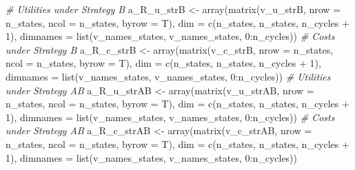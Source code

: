 \documentclass[
]{article}
\newenvironment{Shaded}{\begin{snugshade}}{\end{snugshade}}
\newcommand{\AttributeTok}[1]{\textcolor[rgb]{0.77,0.63,0.00}{#1}}
\newcommand{\CommentTok}[1]{\textcolor[rgb]{0.56,0.35,0.01}{\textit{#1}}}
\newcommand{\DecValTok}[1]{\textcolor[rgb]{0.00,0.00,0.81}{#1}}
\newcommand{\FunctionTok}[1]{\textcolor[rgb]{0.00,0.00,0.00}{#1}}
\newcommand{\NormalTok}[1]{#1}
\newcommand{\OtherTok}[1]{\textcolor[rgb]{0.56,0.35,0.01}{#1}}
\newcommand{\SpecialCharTok}[1]{\textcolor[rgb]{0.00,0.00,0.00}{#1}}
\begin{document}
\begin{Shaded}
\begin{Highlighting}[]
\CommentTok{\# Utilities under Strategy B}
\NormalTok{a\_R\_u\_strB }\OtherTok{\textless{}{-}}  \FunctionTok{array}\NormalTok{(}\FunctionTok{matrix}\NormalTok{(v\_u\_strB, }\AttributeTok{nrow =}\NormalTok{ n\_states, }\AttributeTok{ncol =}\NormalTok{ n\_states, }\AttributeTok{byrow =}\NormalTok{ T), }
                  \AttributeTok{dim =} \FunctionTok{c}\NormalTok{(n\_states, n\_states, n\_cycles }\SpecialCharTok{+} \DecValTok{1}\NormalTok{),}
                  \AttributeTok{dimnames =} \FunctionTok{list}\NormalTok{(v\_names\_states, v\_names\_states, }\DecValTok{0}\SpecialCharTok{:}\NormalTok{n\_cycles))}
\CommentTok{\# Costs under Strategy B}
\NormalTok{a\_R\_c\_strB }\OtherTok{\textless{}{-}} \FunctionTok{array}\NormalTok{(}\FunctionTok{matrix}\NormalTok{(v\_c\_strB, }\AttributeTok{nrow =}\NormalTok{ n\_states, }\AttributeTok{ncol =}\NormalTok{ n\_states, }\AttributeTok{byrow =}\NormalTok{ T), }
                  \AttributeTok{dim =} \FunctionTok{c}\NormalTok{(n\_states, n\_states, n\_cycles }\SpecialCharTok{+} \DecValTok{1}\NormalTok{),}
                  \AttributeTok{dimnames =} \FunctionTok{list}\NormalTok{(v\_names\_states, v\_names\_states, }\DecValTok{0}\SpecialCharTok{:}\NormalTok{n\_cycles))}
\CommentTok{\# Utilities under Strategy AB}
\NormalTok{a\_R\_u\_strAB }\OtherTok{\textless{}{-}}  \FunctionTok{array}\NormalTok{(}\FunctionTok{matrix}\NormalTok{(v\_u\_strAB, }\AttributeTok{nrow =}\NormalTok{ n\_states, }\AttributeTok{ncol =}\NormalTok{ n\_states, }\AttributeTok{byrow =}\NormalTok{ T), }
                  \AttributeTok{dim =} \FunctionTok{c}\NormalTok{(n\_states, n\_states, n\_cycles }\SpecialCharTok{+} \DecValTok{1}\NormalTok{),}
                  \AttributeTok{dimnames =} \FunctionTok{list}\NormalTok{(v\_names\_states, v\_names\_states, }\DecValTok{0}\SpecialCharTok{:}\NormalTok{n\_cycles))}
\CommentTok{\# Costs under Strategy AB}
\NormalTok{a\_R\_c\_strAB }\OtherTok{\textless{}{-}} \FunctionTok{array}\NormalTok{(}\FunctionTok{matrix}\NormalTok{(v\_c\_strAB, }\AttributeTok{nrow =}\NormalTok{ n\_states, }\AttributeTok{ncol =}\NormalTok{ n\_states, }\AttributeTok{byrow =}\NormalTok{ T), }
                  \AttributeTok{dim =} \FunctionTok{c}\NormalTok{(n\_states, n\_states, n\_cycles }\SpecialCharTok{+} \DecValTok{1}\NormalTok{),}
                  \AttributeTok{dimnames =} \FunctionTok{list}\NormalTok{(v\_names\_states, v\_names\_states, }\DecValTok{0}\SpecialCharTok{:}\NormalTok{n\_cycles))}
\end{Highlighting}
\end{Shaded}
\end{document}
